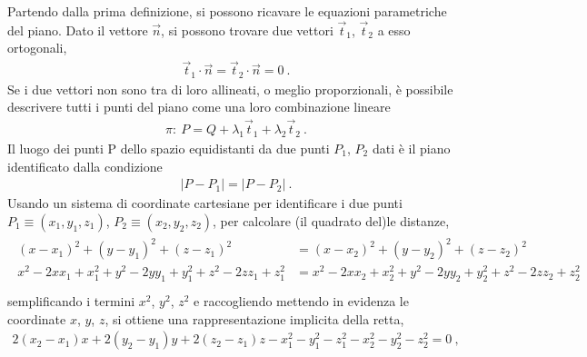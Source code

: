 \documentclass[letterpaper,10pt,english]{jupyterBook}
\begin{document}
\sphinxAtStartPar
{}
Partendo dalla prima definizione, si possono ricavare le equazioni parametriche del piano. Dato il vettore \(\vec{n}\), si possono trovare due vettori \(\vec{t}_1\), \(\vec{t}_2\) a esso ortogonali,
\begin{equation*}
\begin{split}\vec{t}_1 \cdot \vec{n} = \vec{t}_2 \cdot \vec{n} = 0 \ .\end{split}
\end{equation*}
\sphinxAtStartPar
Se i due vettori non sono tra di loro allineati, o meglio proporzionali, è possibile descrivere tutti i punti del piano come una loro combinazione lineare
\begin{equation*}
\begin{split}\pi: \ P = Q + \lambda_1 \vec{t}_1 + \lambda_2 \vec{t}_2 \ .\end{split}
\end{equation*}
\sphinxAtStartPar
{} Il luogo dei punti P dello spazio equidistanti da due punti \(P_1\), \(P_2\) dati è il piano identificato dalla condizione
\begin{equation*}
\begin{split}|P - P_1| = | P - P_2 | \ .\end{split}
\end{equation*}
\sphinxAtStartPar
Usando un sistema di coordinate cartesiane per identificare i due punti \(P_1 \equiv (x_1,y_1,z_1)\), \(P_2 \equiv (x_2,y_2,z_2)\), per calcolare (il quadrato del)le distanze,
\begin{equation*}
\begin{split}\begin{aligned}
 (x - x_1)^2 + (y - y_1)^2 + (z - z_1)^2 &=  (x - x_2)^2 + (y - y_2)^2 + (z - z_2)^2 \\
 x^2 - 2 x x_1 + x_1^2 + y^2 - 2 y y_1 + y_1^2 + z^2 - 2 z z_1 + z_1^2 &=  x^2 - 2 x x_2 + x_2^2 + y^2 - 2 y y_2 + y_2^2 + z^2 - 2 z z_2 + z_2^2 \\
\end{aligned}\end{split}
\end{equation*}
\sphinxAtStartPar
semplificando i termini \(x^2\), \(y^2\), \(z^2\) e raccogliendo mettendo in evidenza le coordinate \(x\), \(y\), \(z\), si ottiene una rappresentazione implicita della retta,
\begin{equation}\label{equation:ch/analytic_geometry/analytic_geometry_3d/planes:eq:geometry:analytic:3d:planes:def-3-1}
\begin{split}  2 ( x_2 - x_1 ) x + 2 ( y_2 - y_1 ) y + 2 ( z_2 - z_1 ) z - x_1^2 - y_1^2 - z_1^2 - x_2^2 - y_2^2 - z_2^2 = 0 \ ,\end{split}
\end{equation}
\end{document}
